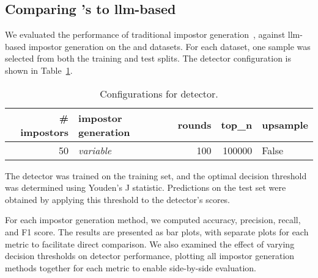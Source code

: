 \subsection{Comparing \citet{koppel_determining_2014}'s to \ac{llm}-based \imps{}}

We evaluated the performance of traditional impostor generation~\citep{koppel_determining_2014}, against \ac{llm}-based impostor generation on the \dataBlog{} and \dataStudent{} datasets. 
For each dataset, one sample was selected from both the training and test splits. 
The detector configuration is shown in Table~\ref{tab:imp_gen_comp}.

\begin{table}[h]
\centering\small
\caption{Configurations for detector.}
\label{tab:imp_gen_comp}
\begin{tabular}{@{}rlrrl@{}}   %
\toprule
\# impostors & impostor generation & rounds & top\_n & upsample \\
\midrule
50 & \textit{variable} & 100 & \num{100000} & False \\
\bottomrule
\end{tabular}%
\end{table}

The detector was trained on the training set, and the optimal decision threshold was determined using Youden’s J statistic. 
Predictions on the test set were obtained by applying this threshold to the detector’s scores.

For each impostor generation method, we computed accuracy, precision, recall, and F1 score. 
The results are presented as bar plots, with separate plots for each metric to facilitate direct comparison. 
We also examined the effect of varying decision thresholds on detector performance, plotting all impostor generation methods together for each metric to enable side-by-side evaluation.
